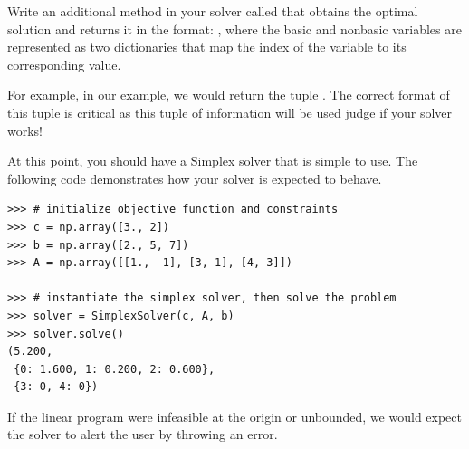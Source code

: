 \begin{problem}
Write an additional method in your solver called  that obtains the optimal solution and returns it in the format: , where the basic and nonbasic variables are represented as two dictionaries that map the index of the variable to 
its corresponding value.

For example, in our example, we would return the tuple . 
The correct format of this tuple is critical as this tuple of information will be used judge if your solver works!
\end{problem}

At this point, you should have a Simplex solver that is simple to use. The following code demonstrates how your solver is 
expected to behave.

\begin{lstlisting}
>>> # initialize objective function and constraints
>>> c = np.array([3., 2])
>>> b = np.array([2., 5, 7])
>>> A = np.array([[1., -1], [3, 1], [4, 3]])

>>> # instantiate the simplex solver, then solve the problem
>>> solver = SimplexSolver(c, A, b)
>>> solver.solve()
(5.200,
 {0: 1.600, 1: 0.200, 2: 0.600},
 {3: 0, 4: 0})
\end{lstlisting}

If the linear program were infeasible at the origin or unbounded, we would expect the solver to alert the user by throwing an error.

